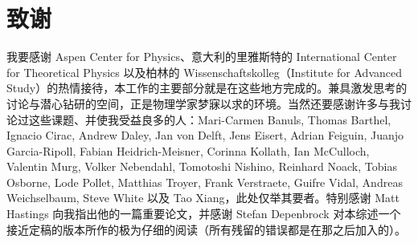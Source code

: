 \documentclass[a4paper,10pt,oneside,onecolumn,1p,times]{elsarticle}
\begin{document}
\section{致谢}
我要感谢 Aspen Center for Physics、意大利的里雅斯特的 International Center for Theoretical Physics 以及柏林的 Wissenschaftskolleg（Institute for Advanced Study）的热情接待，本工作的主要部分就是在这些地方完成的。兼具激发思考的讨论与潜心钻研的空间，正是物理学家梦寐以求的环境。当然还要感谢许多与我讨论过这些课题、并使我受益良多的人：Mari-Carmen Banuls, Thomas Barthel, Ignacio Cirac, Andrew Daley, Jan von Delft, Jens Eisert, Adrian Feiguin, Juanjo Garcia-Ripoll, Fabian Heidrich-Meisner, Corinna Kollath, Ian McCulloch, Valentin Murg, Volker Nebendahl, Tomotoshi Nishino, Reinhard Noack, Tobias Osborne, Lode Pollet, Matthias Troyer, Frank Verstraete, Guifre Vidal, Andreas Weichselbaum, Steve White 以及 Tao Xiang，此处仅举其要者。特别感谢 Matt Hastings 向我指出他的一篇重要论文，并感谢 Stefan Depenbrock 对本综述一个接近定稿的版本所作的极为仔细的阅读（所有残留的错误都是在那之后加入的）。
\end{document}
